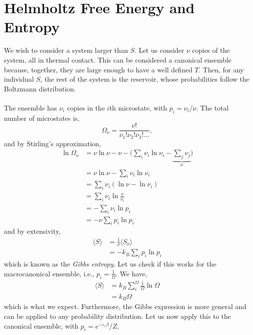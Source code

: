 \documentclass{book}
\begin{document}
\section{Helmholtz Free Energy and Entropy}
We wish to consider a system larger than $S$. Let us consider $\nu$ copies of the system, all in thermal contact. This can be considered a canonical ensemble because, together, they are large enough to have a well defined $T$. Then, for any individual $S$, the rest of the system is the reservoir, whose probabilities follow the Boltzmann distribution.
\\\\
The ensemble has $\nu_i$ copies in the $i$th microstate, with $p_i = \nu_i/\nu$. The total number of microstates is,
\begin{equation}
	\Omega_{\nu} = \frac{\nu!}{\nu_1!\nu_2!\nu_3!\ldots},
\end{equation} 
and by Stirling's approximation,
\begin{equation}
	\begin{split}
	\ln\Omega_{\nu} &= \nu\ln\nu - \nu -\biggl(\sum_i \nu_i\ln\nu_i - \underbrace{\sum_j\nu_j}_{\nu}\biggr) \\
	& = \nu\ln\nu - \sum_i\nu_i\ln\nu_i \\ & = \sum_i\nu_i(\ln\nu - \ln\nu_i) \\
	& = \sum_i \nu_i\ln\frac{\nu}{\nu_i} \\
	& = -\sum_i\nu_i\ln p_i \\
	& = -\nu\sum_i p_i\ln p_i
	\end{split}
\end{equation}
and by extensivity,
\begin{equation}
	\begin{split}
		\langle S \rangle &= \frac{1}{\nu}\langle S_{\nu}\rangle \\
		& \boxed {= - k_B\sum_ip_i\ln p_i}
	\end{split}
\end{equation}
which is known as the \textit{Gibbs entropy}. Let us check if this works for the macrocanonical ensemble, i.e., $p_i = \frac{1}{\Omega}$. We have,
\begin{equation}
	\begin{split}
	\langle S \rangle &= k_B\sum_i^{\Omega}\frac{1}{\Omega}\ln \Omega \\
	& = k_B \Omega
	\end{split}
\end{equation}
which is what we expect. Furthermore, the Gibbs expression is more general and can be applied to any probability distribution. Let us now apply this to the canonical ensemble, with $p_i = e^{-\varepsilon_i\beta}/Z$,
\end{document}
